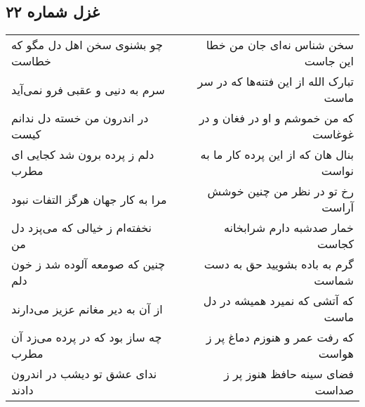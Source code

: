 \begin{center}
\section*{غزل شماره ۲۲}
\label{sec:sh022}
\begin{longtable}{l p{0.5cm} r}
چو بشنوی سخن اهل دل مگو که خطاست
&&
سخن شناس نه‌ای جان من خطا این جاست
\\
سرم به دنیی و عقبی فرو نمی‌آید
&&
تبارک الله از این فتنه‌ها که در سر ماست
\\
در اندرون من خسته دل ندانم کیست
&&
که من خموشم و او در فغان و در غوغاست
\\
دلم ز پرده برون شد کجایی ای مطرب
&&
بنال هان که از این پرده کار ما به نواست
\\
مرا به کار جهان هرگز التفات نبود
&&
رخ تو در نظر من چنین خوشش آراست
\\
نخفته‌ام ز خیالی که می‌پزد دل من
&&
خمار صدشبه دارم شرابخانه کجاست
\\
چنین که صومعه آلوده شد ز خون دلم
&&
گرم به باده بشویید حق به دست شماست
\\
از آن به دیر مغانم عزیز می‌دارند
&&
که آتشی که نمیرد همیشه در دل ماست
\\
چه ساز بود که در پرده می‌زد آن مطرب
&&
که رفت عمر و هنوزم دماغ پر ز هواست
\\
ندای عشق تو دیشب در اندرون دادند
&&
فضای سینه حافظ هنوز پر ز صداست
\\
\end{longtable}
\end{center}
